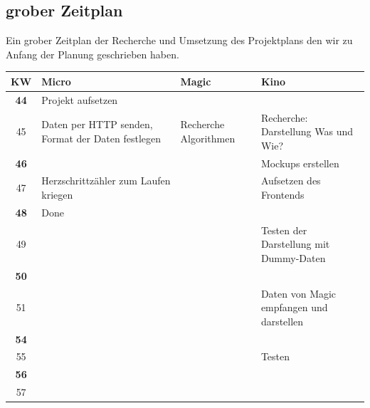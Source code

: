 \documentclass[a4paper, 11pt]{article}
\begin{document}
\subsection{grober Zeitplan}
Ein grober Zeitplan der Recherche und Umsetzung des Projektplans den wir zu Anfang der Planung geschrieben haben.
\begin{center}
    \begin{tabularx}{\textwidth}{ |c|X|X|X| }
        \hline
        \textbf{KW} & \textbf{Micro}                                    & \textbf{Magic}        & \textbf{Kino}                            \\
        \hline
        \textbf{44} & Projekt aufsetzen                                 &                       &                                          \\
        \hline
        45          & Daten per HTTP senden, Format der Daten festlegen & Recherche Algorithmen & Recherche: Darstellung Was und Wie?      \\
        \hline
        \textbf{46} &                                                   &                       & Mockups erstellen                        \\
        \hline
        47          & Herzschrittzähler zum Laufen kriegen              &                       & Aufsetzen des Frontends                  \\
        \hline
        \textbf{48} & Done                                              &                       &                                          \\
        \hline
        49          &                                                   &                       & Testen der Darstellung mit Dummy-Daten   \\
        \hline
        \textbf{50} &                                                   &                       &                                          \\
        \hline
        51          &                                                   &                       & Daten von Magic empfangen und darstellen \\
        \hline
        \textbf{54} &                                                   &                       &                                          \\
        \hline
        55          &                                                   &                       & Testen                                   \\
        \hline
        \textbf{56} &                                                   &                       &                                          \\
        \hline
        57          &                                                   &                       &                                          \\
        \hline
    \end{tabularx}
\end{center}
\clearpage
\end{document}
